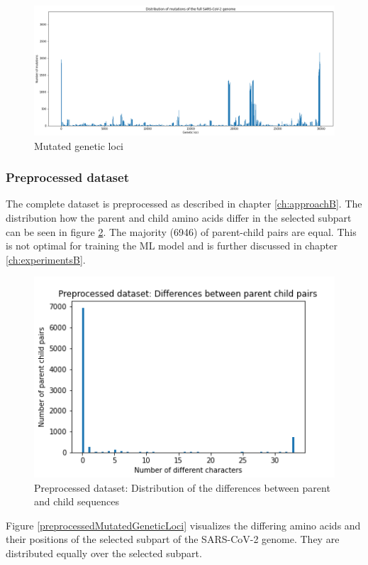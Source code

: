 \begin{figure}[ht!]
	\centering
	\includegraphics[width=1.0\linewidth]{figures/mutatedGeneticLoci.png}
	\caption{Mutated genetic loci \cite{own representation}}
	\label{mutatedGeneticLoci}
\end{figure}

\newpage
\subsubsection{Preprocessed dataset}  \label{ch:experimentsAb}

The complete dataset is preprocessed as described in chapter \ref{ch:approachB}. The distribution how the parent and child amino acids differ in the selected subpart can be seen in figure \ref{preprocessedDistributionDifferencesParentChild}. The majority (6946) of parent-child pairs are equal. This is not optimal for training the \ac{ML} model and is further discussed in chapter \ref{ch:experimentsB}. 

\begin{figure}[ht]
	\centering
	\includegraphics[width=0.6\linewidth]{figures/preprocessedDistributionDifferencesParentChild.png}
	\caption{Preprocessed dataset: Distribution of the differences between parent and child sequences \cite{own representation}}
	\label{preprocessedDistributionDifferencesParentChild}
\end{figure}

Figure \ref{preprocessedMutatedGeneticLoci} visualizes the differing amino acids and their positions of the selected subpart of the \ac{SARS-CoV-2} genome. They are distributed equally over the selected subpart.

